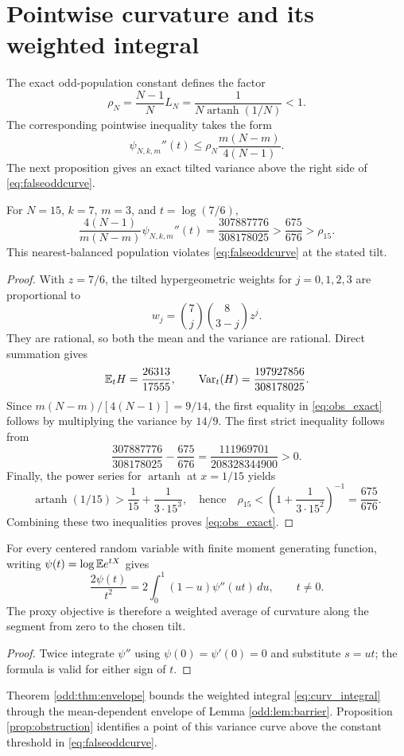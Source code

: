 \section{Pointwise curvature and its weighted integral}\label{sec:curvature_obstruction}
The exact odd-population constant defines the factor
\[
 \rho_N=\frac{N-1}{N}L_N=\frac{1}{N\operatorname{artanh}(1/N)}<1.
\]
The corresponding pointwise inequality takes the form
\begin{equation}\label{eq:falseoddcurve}
 \psi_{N,k,m}''(t)\le\rho_N\frac{m(N-m)}{4(N-1)}.
\end{equation}
The next proposition gives an exact tilted variance above the right side of \eqref{eq:falseoddcurve}.

\begin{proposition}\label{prop:obstruction}
For $N=15$, $k=7$, $m=3$, and $t=\log(7/6)$,
\begin{equation}\label{eq:obs_exact}
 \frac{4(N-1)}{m(N-m)}\psi_{N,k,m}''(t)
 =\frac{307887776}{308178025}
 >\frac{675}{676}>\rho_{15}.
\end{equation}
This nearest-balanced population violates \eqref{eq:falseoddcurve} at the stated tilt.
\end{proposition}

\begin{proof}
With $z=7/6$, the tilted hypergeometric weights for $j=0,1,2,3$ are proportional to
\[
 w_j=\binom7j\binom8{3-j}z^j.
\]
They are rational, so both the mean and the variance are rational. Direct summation gives
\[
 \mathbb E_tH=\frac{26313}{17555},\qquad
 \operatorname{Var}_t(H)=\frac{197927856}{308178025}.
\]
Since $m(N-m)/[4(N-1)]=9/14$, the first equality in \eqref{eq:obs_exact} follows by multiplying the variance by $14/9$. The first strict inequality follows from
\[
 \frac{307887776}{308178025}-\frac{675}{676}
 =\frac{111969701}{208328344900}>0.
\]
Finally, the power series for $\operatorname{artanh}$ at $x=1/15$ yields
\[
 \operatorname{artanh}(1/15)>\frac1{15}+\frac1{3\cdot15^3},
 \quad\text{hence}\quad
 \rho_{15}<\left(1+\frac1{3\cdot15^2}\right)^{-1}=\frac{675}{676}.
\]
Combining these two inequalities proves \eqref{eq:obs_exact}.
\end{proof}

\begin{proposition}\label{prop:integral}
For every centered random variable with finite moment generating function, writing $\psi(t)=\log\mathbb E e^{tX}$ gives
\begin{equation}\label{eq:curv_integral}
 \frac{2\psi(t)}{t^2}=2\int_0^1(1-u)\psi''(ut)\,du,
 \qquad t\ne0.
\end{equation}
The proxy objective is therefore a weighted average of curvature along the segment from zero to the chosen tilt.
\end{proposition}
\begin{proof}
Twice integrate $\psi''$ using $\psi(0)=\psi'(0)=0$ and substitute $s=ut$; the formula is valid for either sign of $t$.
\end{proof}

Theorem \ref{odd:thm:envelope} bounds the weighted integral \eqref{eq:curv_integral} through the mean-dependent envelope of Lemma \ref{odd:lem:barrier}. Proposition \ref{prop:obstruction} identifies a point of this variance curve above the constant threshold in \eqref{eq:falseoddcurve}.
